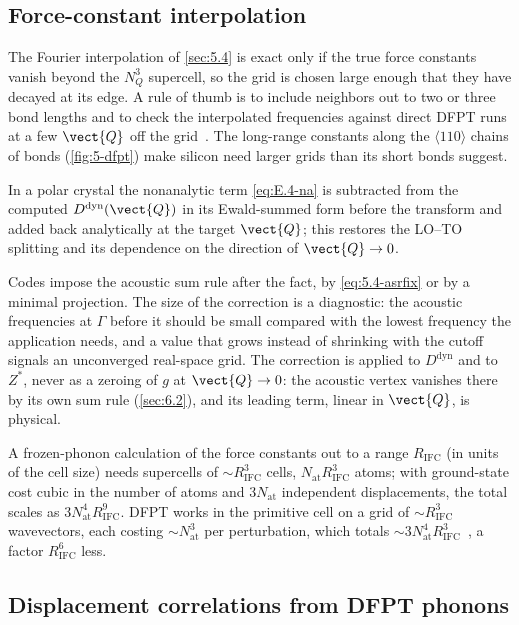 \subsection{Force-constant interpolation}

The Fourier interpolation of \cref{sec:5.4} is exact only if the true force constants vanish beyond the $N_Q^3$ supercell, so the grid is chosen large enough that they have decayed at its edge. A rule of thumb is to include neighbors out to two or three bond lengths and to check the interpolated frequencies against direct DFPT runs at a few $\vect{Q}$ off the grid~\cite[Sect.~II.D.3]{baroni2001phonons}. The long-range constants along the $\langle 110\rangle$ chains of bonds (\cref{fig:5-dfpt}) make silicon need larger grids than its short bonds suggest.

In a polar crystal the nonanalytic term \cref{eq:E.4-na} is subtracted from the computed $D^{\mathrm{dyn}}(\vect{Q})$ in its Ewald-summed form before the transform and added back analytically at the target $\vect{Q}$; this restores the LO--TO splitting and its dependence on the direction of $\vect{Q}\to 0$.

Codes impose the acoustic sum rule after the fact, by \cref{eq:5.4-asrfix} or by a minimal projection. The size of the correction is a diagnostic: the acoustic frequencies at $\Gamma$ before it should be small compared with the lowest frequency the application needs, and a value that grows instead of shrinking with the cutoff signals an unconverged real-space grid. The correction is applied to $D^{\mathrm{dyn}}$ and to $Z^*$, never as a zeroing of $g$ at $\vect{Q}\to 0$: the acoustic vertex vanishes there by its own sum rule (\cref{sec:6.2}), and its leading term, linear in $\vect{Q}$, is physical.

A frozen-phonon calculation of the force constants out to a range $R_{\mathrm{IFC}}$ (in units of the cell size) needs supercells of $\sim R_{\mathrm{IFC}}^3$ cells, $N_{\mathrm{at}}R_{\mathrm{IFC}}^3$ atoms; with ground-state cost cubic in the number of atoms and $3N_{\mathrm{at}}$ independent displacements, the total scales as $3N_{\mathrm{at}}^4R_{\mathrm{IFC}}^9$. DFPT works in the primitive cell on a grid of $\sim R_{\mathrm{IFC}}^3$ wavevectors, each costing $\sim N_{\mathrm{at}}^3$ per perturbation, which totals $\sim 3N_{\mathrm{at}}^4R_{\mathrm{IFC}}^3$~\cite[Sect.~IV.B]{baroni2001phonons}, a factor $R_{\mathrm{IFC}}^6$ less.

\subsection{Displacement correlations from DFPT phonons}

